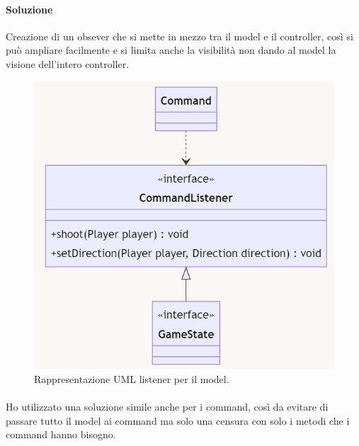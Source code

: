 \documentclass[a4paper,12pt]{report}
\begin{document}
\paragraph*{Soluzione} Creazione di un obsever che si mette in mezzo tra il model e il controller, così si può ampliare facilmente e si limita anche la visibilità non dando al model la visione dell’intero controller.
%
\begin{figure}[H]
	\centering{}
	\includegraphics[scale=0.75]{img/commandListener.png}
	\caption{Rappresentazione UML listener per il model.}
	\label{img:strategy}
	\end{figure}
%
\paragraph{} Ho utilizzato una soluzione simile anche per i command, così da evitare di passare tutto il model ai command ma solo una censura con solo i metodi che i command hanno bisogno.
\newpage
\end{document}
